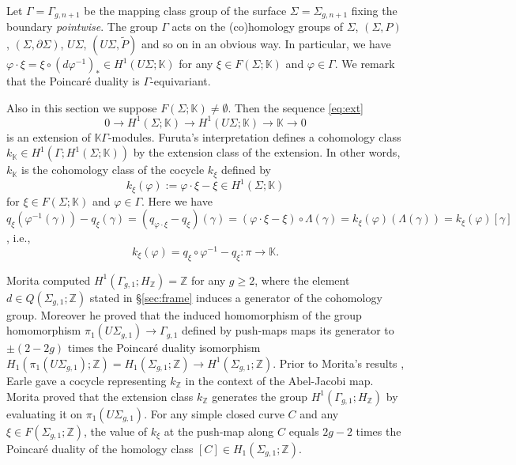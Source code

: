 \documentclass[a4paper,12pt, twoside]{amsart}
\theoremstyle{definition}
\theoremstyle{remark}
\numberwithin{equation}{section}
\newcommand\bK{{\mathbb{K}}}
\newcommand\bZ{{\mathbb{Z}}}
\newcommand\inv{^{-1}}
\newcommand\La{\Lambda}
\newcommand\pa{\partial}
\newcommand\Sgone{\Sigma_{g,1}}
\begin{document}
Let $\Gamma = \Gamma_{g,n+1}$ be the mapping class group of the surface $\Sigma = \Sigma_{g,n+1}$ fixing the boundary {\it pointwise}. The group $\Gamma$ acts on the (co)homology groups of $\Sigma$, $(\Sigma, P)$, $(\Sigma, \pa\Sigma)$, 
$U\Sigma$, $(U\Sigma, \tilde P)$ and so on in an obvious way.
In particular, we have $\varphi\cdot\xi = \xi\circ (d\varphi\inv)_* \in H^1(U\Sigma; \bK)$ for any $\xi \in F(\Sigma; \bK)$ and $\varphi \in \Gamma$. 
We remark that the Poincar\'e duality is $\Gamma$-equivariant. \par
Also in this section we suppose $F(\Sigma; \bK) \neq \emptyset$. 
Then the sequence \eqref{eq:ext} 
$$
0 \to H^1(\Sigma; \bK) \to H^1(U\Sigma; \bK) \to \bK \to 0
$$
is an extension of $\bK\Gamma$-modules. 
Furuta's interpretation \cite[pp.569-]{Mo97} defines a cohomology class $k_\bK \in H^1(\Gamma; H^1(\Sigma; \bK))$ by the extension class of the extension. In other words, $k_\bK$ is the cohomology class of the cocycle $k_\xi$ defined by 
\begin{equation}\label{kxi}
k_\xi(\varphi) := \varphi\cdot\xi - \xi \in H^1(\Sigma; \bK) %
\end{equation}
for $\xi \in F(\Sigma; \bK)$ and $\varphi \in \Gamma$.
Here we have $q_{\xi}(\varphi\inv(\gamma))-q_\xi(\gamma) = (q_{\varphi\cdot\xi}-q_\xi)(\gamma) = (\varphi\cdot\xi - \xi) \circ \La(\gamma) = k_\xi(\varphi)(\La(\gamma)) = k_\xi(\varphi)[\gamma]$, i.e., 
\begin{equation}\label{eq:kqq}
k_\xi(\varphi) = q_{\xi}\circ\varphi\inv-q_\xi: \pi \to \bK.
\end{equation}
\par
Morita \cite{Mo89} computed $H^1(\Gamma_{g,1}; H_\bZ) = \bZ$ for any $g \geq 2$, where the element $d \in Q(\Sigma_{g,1}; \bZ)$ stated in \S\ref{sec:frame} induces a generator of the cohomology group. Moreover he proved that the induced homomorphism of the group homomorphism $\pi_1(U\Sgone) \to \Gamma_{g,1}$ defined by push-maps maps its generator to $\pm(2-2g)$ times the Poincar\'e duality isomorphism $H_1(\pi_1(U\Sigma_{g,1}); \bZ) = H_1(\Sigma_{g,1}; \bZ) \to H^1(\Sigma_{g,1}; \bZ)$. 
Prior to Morita's results \cite{Mo89}, Earle \cite{E78} gave a cocycle representing $k_\bZ$ in the context of the Abel-Jacobi map. 
Morita \cite[Proposition 4.1]{Mo97} proved that the extension class $k_\bZ$ generates the group $H^1(\Gamma_{g,1}; H_\bZ)$ by evaluating it on $\pi_1(U\Sgone)$. 
For any simple closed curve $C$ and any $\xi \in F(\Sigma_{g,1}; \bZ)$, 
the value of $k_\xi$ at the push-map along $C$ equals $2g-2$ times the Poincar\'e duality of the homology class $[C] \in H_1(\Sigma_{g,1}; \bZ)$. 
\end{document}
